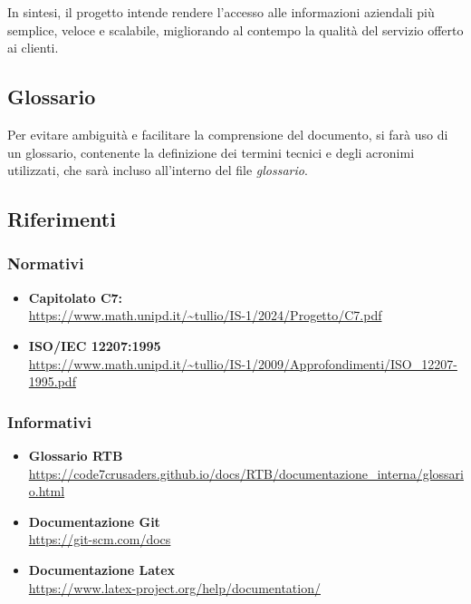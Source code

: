 In sintesi, il progetto intende rendere l'accesso alle informazioni aziendali più semplice, veloce e scalabile, 
migliorando al contempo la qualità del servizio offerto ai clienti.


\subsection{Glossario}
Per evitare ambiguità e facilitare la comprensione del documento, si farà uso di un glossario, 
contenente la definizione dei termini tecnici e degli acronimi utilizzati, 
che sarà incluso all'interno del file \textit{glossario}.


\subsection{Riferimenti}
\subsubsection{Normativi}
\begin{itemize}
	\item \textbf{Capitolato C7:} \\ \url{https://www.math.unipd.it/~tullio/IS-1/2024/Progetto/C7.pdf}
	\item \textbf{ISO/IEC 12207:1995} \\ \url{https://www.math.unipd.it/~tullio/IS-1/2009/Approfondimenti/ISO_12207-1995.pdf}
\end{itemize}

\subsubsection{Informativi}
\begin{itemize}
    \item\textbf{Glossario RTB}\\ \url{https://code7crusaders.github.io/docs/RTB/documentazione_interna/glossario.html}
    \item\textbf{Documentazione Git}\\ \url{https://git-scm.com/docs}
    \item\textbf{Documentazione Latex}\\ \url{https://www.latex-project.org/help/documentation/}

\end{itemize}